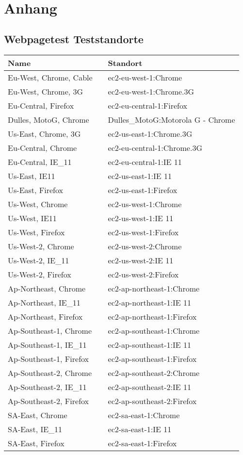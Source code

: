\section{Anhang} %
\label{sec:anhang}

	\subsection{Webpagetest Teststandorte} %
	\label{sub:webpagetest_teststandorte}

		\begin{tabular}[pht]{lll}
		  Name && Standort \\ \hline
			Eu-West, Chrome, Cable && ec2-eu-west-1:Chrome \\[8pt]
			Eu-West, Chrome, 3G	&& ec2-eu-west-1:Chrome.3G \\[8pt]
			Eu-Central, Firefox	&& ec2-eu-central-1:Firefox \\[8pt]
			Dulles, MotoG, Chrome &&	Dulles\_MotoG:Motorola G - Chrome \\[8pt]
			Us-East, Chrome, 3G	&& ec2-us-east-1:Chrome.3G \\[8pt]
			Eu-Central, Chrome	&& ec2-eu-central-1:Chrome.3G \\[8pt]
			Eu-Central, IE\_11	&& ec2-eu-central-1:IE 11 \\[8pt]
			Us-East, IE11	&& ec2-us-east-1:IE 11 \\[8pt]
			Us-East, Firefox	&& ec2-us-east-1:Firefox \\[8pt]
			Us-West, Chrome	&& ec2-us-west-1:Chrome \\[8pt]
			Us-West, IE11	&& ec2-us-west-1:IE 11 \\[8pt]
			Us-West, Firefox	&& ec2-us-west-1:Firefox \\[8pt]
			Us-West-2, Chrome	&& ec2-us-west-2:Chrome \\[8pt]
			Us-West-2, IE\_11	&& ec2-us-west-2:IE 11 \\[8pt]
			Us-West-2, Firefox	&& ec2-us-west-2:Firefox \\[8pt]
			Ap-Northeast, Chrome	&& ec2-ap-northeast-1:Chrome \\[8pt]
			Ap-Northeast, IE\_11	&& ec2-ap-northeast-1:IE 11 \\[8pt]
			Ap-Northeast, Firefox	&& ec2-ap-northeast-1:Firefox \\[8pt]
			Ap-Southeast-1, Chrome	&& ec2-ap-southeast-1:Chrome \\[8pt]
			Ap-Southeast-1, IE\_11	&& ec2-ap-southeast-1:IE 11 \\[8pt]
			Ap-Southeast-1, Firefox	&& ec2-ap-southeast-1:Firefox \\[8pt]
			Ap-Southeast-2, Chrome	&& ec2-ap-southeast-2:Chrome \\[8pt]
			Ap-Southeast-2, IE\_11	&& ec2-ap-southeast-2:IE 11 \\[8pt]
			Ap-Southeast-2, Firefox	&& ec2-ap-southeast-2:Firefox \\[8pt]
			SA-East, Chrome	&& ec2-sa-east-1:Chrome \\[8pt]
			SA-East, IE\_11	&& ec2-sa-east-1:IE 11 \\[8pt]
			SA-East, Firefox	&& ec2-sa-east-1:Firefox \\[8pt]
		\end{tabular}



